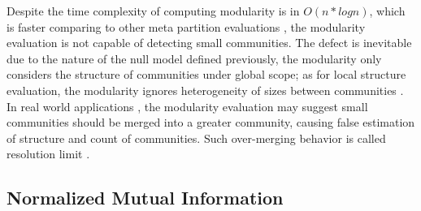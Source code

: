 \documentclass[12pt]{article}
\begin{document}
\bigbreak

Despite the time complexity of computing modularity is in $O(n*log n)$, which is faster comparing to other meta partition evaluations \cite{2, 12}, the modularity evaluation is not capable of detecting small communities. The defect is inevitable due to the nature of the null model defined previously, the modularity only considers the structure of communities under global scope; as for local structure evaluation, the modularity ignores heterogeneity of sizes between communities \cite{13}. In real world applications \cite{9, 10}, the modularity evaluation may suggest small communities should be merged into a greater community, causing false estimation of structure and count of communities. Such over-merging behavior is called resolution limit \cite{13}.


\subsection{Normalized Mutual Information}

\end{document}
